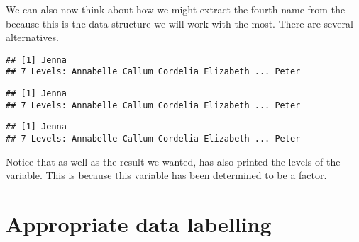 We can also now think about how we might extract the fourth name from the  because this is the data structure we will work with the most. There are several alternatives. 
\begin{knitrout}
\color{fgcolor}\begin{kframe}
\begin{alltt}
\hlstd{MyFirstDF[}\hlstd{,}\hlstd{]}
\end{alltt}
\begin{verbatim}
## [1] Jenna
## 7 Levels: Annabelle Callum Cordelia Elizabeth ... Peter
\end{verbatim}
\begin{alltt}
\hlstd{MyFirstDF[}\hlstd{,}\hlstd{]}
\end{alltt}
\begin{verbatim}
## [1] Jenna
## 7 Levels: Annabelle Callum Cordelia Elizabeth ... Peter
\end{verbatim}
\begin{alltt}
\hlopt{$}\hlstd{Names[}\hlstd{]}
\end{alltt}
\begin{verbatim}
## [1] Jenna
## 7 Levels: Annabelle Callum Cordelia Elizabeth ... Peter
\end{verbatim}
\end{kframe}
\end{knitrout}
 
Notice that as well as the result we wanted, \R{} has also printed the levels of the  variable. This is because this variable has been determined to be a factor. 
 
 
 
\section{Appropriate data labelling} 
 
